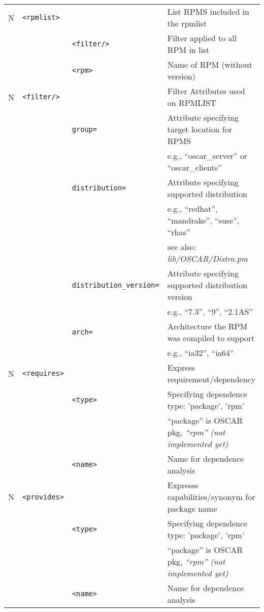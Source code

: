 \begin{table}[h!]
\begin{small}
\begin{center}
\begin{tabular}{|c|l|l|l|}
  N & \verb|<rpmlist>|
		&    
		& List RPMS included in the rpmlist         
		\\\cline{3-4}
%
	& 
		& \verb|<filter/>| 
		& Filter applied to all RPM in list         
		\\\cline{3-4}
%
    & 
		& \verb|<rpm>|    
		& Name of RPM (without version)             
		\\\hline

  N & \verb|<filter/>|
		&     
		& Filter Attributes used on RPMLIST                 
		\\\cline{3-4}
%
    & 
		& \verb|group=|   
		& Attribute specifying target location for RPMS     
		\\
    & 
		&                 
		& e.g., ``oscar\_server'' or ``oscar\_clients''     
		\\\cline{3-4}
%
    & 
		& \verb|distribution=|
		& Attribute specifying supported distribution   
		\\
    & 
		&                 
		& e.g., ``redhat'', ``mandrake'', ``suse'', ``rhas''
		\\
    & 
		&                 
		& see also: \emph{lib/OSCAR/Distro.pm}              
		\\\cline{3-4}
%
    & 
		& \verb|distribution_version=|
		& Attribute specifying supported distribution version  
		\\
    & 
		&                 
		& e.g., ``7.3'', ``9'', ``2.1AS''                   
		\\\cline{3-4}
%
    & 
		& \verb|arch=|    
		& Architecture the RPM was compiled to support      
		\\
    & 
		&                 
		& e.g., ``ia32'', ``ia64''                          
		\\\hline

  N & \verb|<requires>|
  		&   
		& Express requirement/dependency 
		\\\cline{3-4}
%
    & 
		& \verb|<type>|    
		& Specifying dependence type: 'package', 'rpm'
		\\
    & 
		&                 
		&  ``package'' is OSCAR pkg, \emph{``rpm'' (not implemented yet)}      
		\\\cline{3-4}
	&
%
		& \verb|<name>|
		& Name for dependence analysis
		\\\hline

  N & \verb|<provides>|
  		&   
		& Expresss capabilities/synonym for package name
		\\\cline{3-4}
%
    & 
		& \verb|<type>|    
		& Specifying dependence type: 'package', 'rpm'
		\\
    & 
		&                 
		&  ``package'' is OSCAR pkg, \emph{``rpm'' (not implemented yet)}      
		\\\cline{3-4}
%
	&
		& \verb|<name>|
		& Name for dependence analysis
		\\\hline


\end{tabular}
\end{center}
\end{small}
\end{table}

